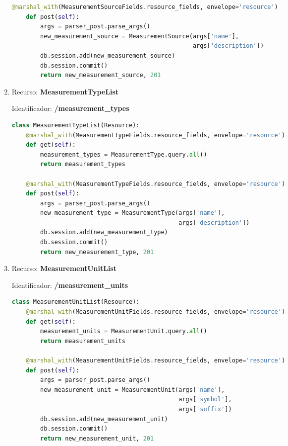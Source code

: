 \begin{enumerate}
\begin{lstlisting}[language=Python]
    @marshal_with(MeasurementSourceFields.resource_fields, envelope='resource')
    def post(self):
        args = parser_post.parse_args()
        new_measurement_source = MeasurementSource(args['name'],
                                                   args['description'])
        db.session.add(new_measurement_source)
        db.session.commit()
        return new_measurement_source, 201
\end{lstlisting}

\item Recurso: \textbf{MeasurementTypeList}

Identificador: \textbf{/measurement\_types}

\begin{lstlisting}[language=Python]
class MeasurementTypeList(Resource):
    @marshal_with(MeasurementTypeFields.resource_fields, envelope='resource')
    def get(self):
        measurement_types = MeasurementType.query.all()
        return measurement_types

    @marshal_with(MeasurementTypeFields.resource_fields, envelope='resource')
    def post(self):
        args = parser_post.parse_args()
        new_measurement_type = MeasurementType(args['name'],
                                               args['description'])
        db.session.add(new_measurement_type)
        db.session.commit()
        return new_measurement_type, 201
\end{lstlisting}

\item Recurso: \textbf{MeasurementUnitList}

Identificador: \textbf{/measurement\_units}

\begin{lstlisting}[language=Python]
class MeasurementUnitList(Resource):
    @marshal_with(MeasurementUnitFields.resource_fields, envelope='resource')
    def get(self):
        measurement_units = MeasurementUnit.query.all()
        return measurement_units

    @marshal_with(MeasurementUnitFields.resource_fields, envelope='resource')
    def post(self):
        args = parser_post.parse_args()
        new_measurement_unit = MeasurementUnit(args['name'],
                                               args['symbol'],
                                               args['suffix'])
        db.session.add(new_measurement_unit)
        db.session.commit()
        return new_measurement_unit, 201
\end{lstlisting}


\end{enumerate}
